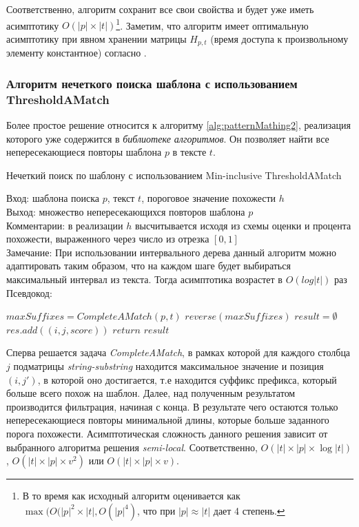 Соответственно, алгоритм сохранит все свои свойства и будет уже иметь асимптотику $O(|p| \times |t|)$\footnote{В то время как исходный алгоритм оценивается как $\max (O(|p|^2 \times |t|, O(|p|^4)$, что при $|p| \approx |t|$ дает 4 степень.}.
Заметим, что алгоритм имеет оптимальную асимптотику при явном хранении матрицы $H_{p,t}$ (время доступа к произвольному элементу константное) согласно \cite{abboud2015tight}.

\subsubsection{Алгоритм нечеткого поиска шаблона с использованием ThresholdAMatch}
Более простое решение относится к алгоритму \ref{alg:patternMathing2}, реализация которого уже содержится в \emph{библиотеке алгоритмов}. 
Он позволяет найти все непересекающиеся повторы шаблона $p$ в тексте $t$.

\begin{algorithm}[h]
\caption{Нечеткий поиск по шаблону с использованием Min-inclusive ThresholdAMatch}\label{alg:patternMathing2}
Вход: шаблона поиска $p$, текст $t$, пороговое значение похожести $h$\\
Выход: множество непересекающихся повторов шаблона $p$\\
Комментарии: в реализации $h$ высчитывается исходя из схемы оценки и процента похожести, выраженного через число из отрезка $[0,1]$\\
Замечание: При использовании интервального дерева данный алгоритм можно адаптировать таким образом, что на каждом шаге будет выбираться максимальный интервал из текста.
Тогда асимптотика возрастет в $O(log|t|)$ раз\\
Псевдокод:
\begin{algorithmic}[1]
\State $maxSuffixes= CompleteAMatch(p,t)$
\State $reverse(maxSuffixes)$
\State $result = \emptyset$
    \State $res.add((i,j,score))$ 
    \EndIf
\EndFor
\State $return$ $result$

\end{algorithmic}
\end{algorithm}

Сперва решается задача \emph{CompleteAMatch}, в рамках которой для каждого столбца $j$ подматрицы \emph{string-substring} находится максимальное значение и позиция $(i,j')$, в которой оно  достигается, т.е находится суффикс префикса, который больше всего похож на шаблон.
Далее, над полученным результатом производится фильтрация, начиная с конца.
В результате чего остаются только непересекающиеся повторы минимальной длины, которые больше заданного порога похожести.
Асимптотическая сложность данного решения зависит от выбранного алгоритма  решения \emph{semi-local}.
Соответственно, $O(|t| \times |p| \times \log |t|)$, $O(|t| \times |p| \times v^2)$ или $O(|t| \times |p| \times v)$.

